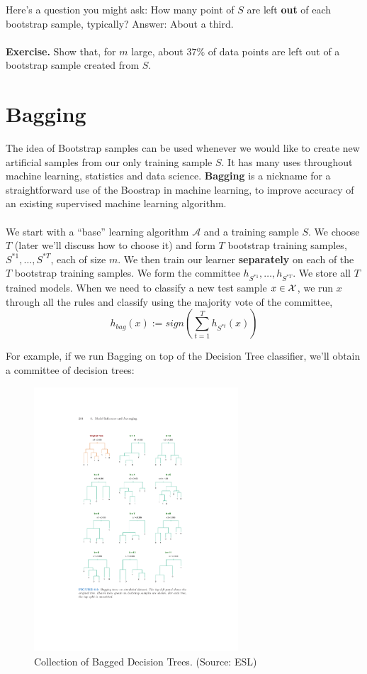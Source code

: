\documentclass[11pt]{article}
\newcommand{\Ac}{\mathcal{A}}
\begin{document}
\noindent
Here's a question you might ask: How many point of $S$ are left {\bf out} of each bootstrap sample, typically?
Answer: About a third.
\\~\\
{\bf Exercise.} 
Show that, for $m$ large, about $37\%$ of data points are left out of a
bootstrap sample created from $S$.






\section{Bagging}

The idea of Bootstrap samples can be used whenever we would like to create new
artificial samples from our only training sample $S$. It has many uses
throughout machine learning, statistics and data science. 
{\bf Bagging} is a nickname for a straightforward use of the Boostrap in machine learning, to
improve accuracy of an existing supervised machine learning algorithm.
\\~\\
 We start with a ``base''
learning algorithm $\Ac$ and a training sample $S$. We choose $T$ (later we'll
discuss how to choose it) and form
$T$ bootstrap training samples, $S^{*1},\ldots, S^{*T}$, each of size $m$. We
then train our learner {\bf separately} on each of the $T$ bootstrap training samples.
We form the committee $h_{S^{*1}},\ldots,h_{S^{*T}}$. We store all $T$ trained
models. When we need to classify a new test sample $x\in\mathcal{X}$,
we run $x$ through all the rules and classify using the 
majority vote of the committee,
\[
  h_{bag}(x) := sign\left( \sum_{t=1}^T h_{S^{*t}} (x)\right)
\]

For example, if we run Bagging on top of the Decision Tree classifier, we'll
obtain a committee of decision trees:
\begin{figure}[H]
  \centering
  \includegraphics[width=3in]{many_trees.pdf}
  \caption{Collection of Bagged Decision Trees. (Source: ESL)}
\end{figure}
\end{document}
